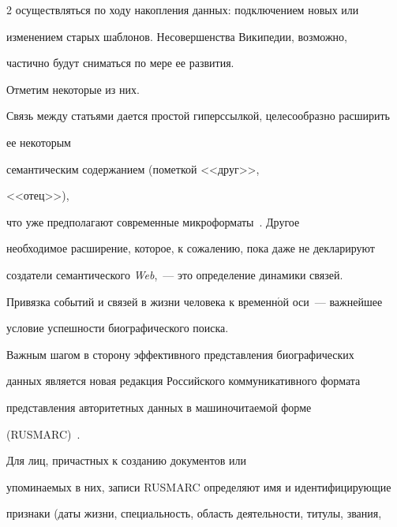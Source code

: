 \begin{multicols}{2}
осуществляться по ходу накопления данных: подключением новых или 


изменением старых шаб\-ло\-нов. Несовершенства Википедии, возможно, 


час\-тич\-но будут сниматься по мере ее развития.\linebreak


 Отметим некоторые из них. 





Связь между статьями дается простой гиперссылкой, целесообразно расширить 


ее некоторым\linebreak\vspace*{-12pt}





\pagebreak





\noindent


семантическим содержанием (пометкой <<друг>>,


 <<отец>>), 


что уже предполагают современные микроформаты~\cite{7mar}. Другое 


необходимое расширение, которое, к сожалению, пока даже не декларируют 


создатели семантического \textit{Web},~--- это определение динамики связей. 


Привязка событий и связей в жизни человека к временн$\acute{\mbox{о}}$й оси~--- важнейшее 


условие успешности биографического поиска.


  


  Важным шагом в сторону эффективного представления биографических 


данных является новая редакция Российского коммуникативного формата 


представления авторитетных данных в машиночитаемой форме 


(RUSMARC)~\cite{8mar}. 





Для лиц, причастных к созданию документов или 


упоми\-на\-емых в них, записи RUSMARC определяют имя и идентифицирующие 


признаки (даты жизни, специальность, область деятельности, титулы, звания, 



\end{multicols}

